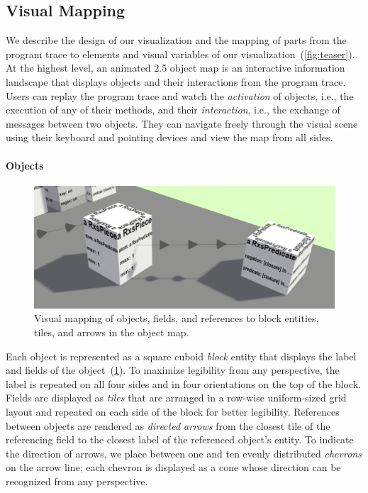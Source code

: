 \subsection{Visual Mapping}
\label{sec:visualization_approach/mapping}

We describe the design of our visualization and the mapping of parts from the program trace to elements and visual variables of our visualization~(\cref{fig:teaser}).
At the highest level, an animated 2.5 object map is an interactive information landscape that displays objects and their interactions from the program trace.
Users can replay the program trace and watch the \emph{activation} of objects, i.e., the execution of any of their methods, and their \emph{interaction}, i.e., the exchange of messages between two objects.
They can navigate freely through the visual scene using their keyboard and pointing devices and view the map from all sides.

\paragraph{Objects}
\label{sec:visualization_approach/mapping/objects}

\begin{figure}
	\includegraphics[width=\linewidth]{sections/03_visualization_approach/mapping/objects}
	\caption{Visual mapping of objects, fields, and references to block entities, tiles, and arrows in the object map.}
	\label{fig:visualization_approach/mapping/objects}
\end{figure}

Each object is represented as a square cuboid \emph{block} entity that displays the label and fields of the object~(\cref{fig:visualization_approach/mapping/objects}).
To maximize legibility from any perspective, the label is repeated on all four sides and in four orientations on the top of the block.
Fields are displayed as \emph{tiles} that are arranged in a row-wise uniform-sized grid layout and repeated on each side of the block for better legibility.
References between objects are rendered as \emph{directed arrows} from the closest tile of the referencing field to the closest label of the referenced object's entity.
To indicate the direction of arrows, we place between one and ten evenly distributed \emph{chevrons} on the arrow line; each chevron is displayed as a cone whose direction can be recognized from any perspective.

